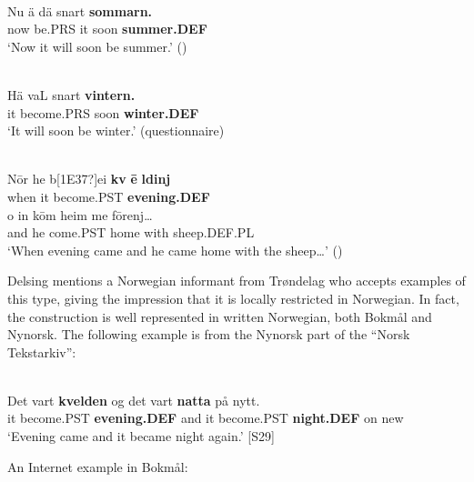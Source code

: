 \ea \label{} 
\\
\gll Nu  ä  dä  snart  \textbf{sommarn.}\\
now  be.PRS  it  soon  \textbf{summer.DEF}\\
\glt ‘Now it will soon be summer.’ (\citet{Broberg1936})

\z

\ea \label{} 
\\
\gll Hä  vaL  snart  \textbf{vintern.}\\
it  become.PRS  soon  \textbf{winter.DEF}\\
\glt ‘It will soon be winter.’ (questionnaire)

\z

\ea \label{} 
\\
\gll N\=or  he  b[1E37?]ei  \textbf{kv} \textbf{\=e} \textbf{ldinj}\\
when  it  become.PST  \textbf{evening.DEF}\\
\gll o  in  k\=om  heim  me  f\=orenj…\\
and  he  come.PST  home  with  sheep.DEF.PL\\
\glt ‘When evening came and he came home with the sheep…’ (\citet[38]{Lundell1936})

\z

Delsing mentions a Norwegian informant from Trøndelag who accepts examples of this type, giving the impression that it is locally restricted in Norwegian. In fact, the construction is well represented in written Norwegian, both Bokmål and Nynorsk. The following example is from the Nynorsk part of the “Norsk Tekstarkiv”: 


\ea \label{} 
\\
\gll Det vart  \textbf{kvelden} og  det  vart  \textbf{natta} på  nytt.\\ %
it  become.PST  \textbf{evening.DEF} and  it  become.PST  \textbf{night.DEF} on  new\\
\glt ‘Evening came and it became night again.’ [S29]

\z

An Internet example in Bokmål: 

